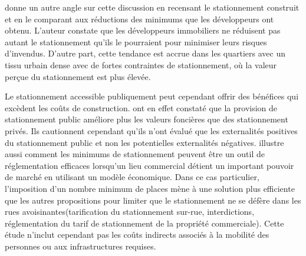     \textcite{stangl_parking_2019} donne un autre angle sur cette discussion en recensant le stationnement construit et en le comparant aux réductions des minimums que les développeurs ont obtenu. L'auteur constate que les développeurs immobiliers ne réduisent pas autant le stationnement qu'ils le pourraient pour minimiser leurs risques d'invendus. D'autre part, cette tendance est accrue dans les quartiers avec un tissu urbain dense avec de fortes contraintes de stationnement, où la valeur perçue du stationnement est plus élevée.  \par
    Le stationnement accessible publiquement peut cependant offrir des bénéfices qui excèdent les coûts de construction. \textcite{cutter_iv_parking_2010} ont en effet constaté que la provision de stationnement public améliore plus les valeurs foncières que des stationnement privés. Ils cautionnent cependant qu'ils n'ont évalué que les externalités positives du stationnement public et non les potentielles externalités négatives. \textcite{olus_inan_spillover_2019} illustre aussi comment les minimums de stationnement peuvent être un outil de réglementation efficaces lorsqu'un lieu commercial détient un important pouvoir de marché en utilisant un modèle économique. Dans ce cas particulier, l'imposition d'un nombre minimum de places mène à une solution plus efficiente que les autres propositions pour limiter que le stationnement ne se défère dans les rues avoisinantes(tarification du stationnement sur-rue, interdictions, réglementation du tarif de stationnement de la propriété commerciale). Cette étude n'inclut cependant pas les coûts indirects associés à la mobilité des personnes ou aux infrastructures requises.\par

